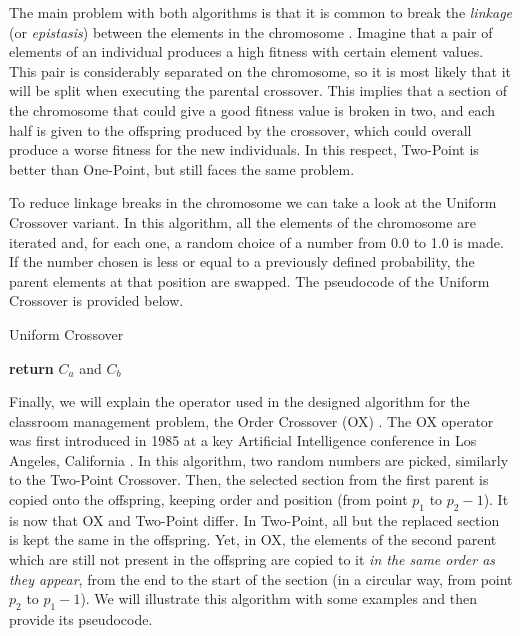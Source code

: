 The main problem with both algorithms is that it is common to break the \textit{linkage} (or \textit{epistasis}) between the elements in the chromosome \cite{luke13metaheuristics}. Imagine that a pair of elements of an individual produces a high fitness with certain element values. This pair is considerably separated on the chromosome, so it is most likely that it will be split when executing the parental crossover. This implies that a section of the chromosome that could give a good fitness value is broken in two, and each half is given to the offspring produced by the crossover, which could overall produce a worse fitness for the new individuals. In this respect, Two-Point is better than One-Point, but still faces the same problem. 

To reduce linkage breaks in the chromosome we can take a look at the Uniform Crossover variant. In this algorithm, all the elements of the chromosome are iterated and, for each one, a random choice of a number from 0.0 to 1.0 is made. If the number chosen is less or equal to a previously defined probability, the parent elements at that position are swapped. The pseudocode of the Uniform Crossover is provided below.

\begin{algorithm}[H]
    \caption{Uniform Crossover}
    \begin{algorithmic}[1]
                \EndIf
            \EndFor
            \State \textbf{return} {$C_{a}$ and $C_{b}$}
        \EndProcedure
    \end{algorithmic}
\end{algorithm}

Finally, we will explain the operator used in the designed algorithm for the classroom management problem, the Order Crossover (OX) \cite{davis85ox}. The OX operator was first introduced in 1985 at a key Artificial Intelligence conference in Los Angeles, California \cite{joshi85ai}. In this algorithm, two random numbers are picked, similarly to the Two-Point Crossover. Then, the selected section from the first parent is copied onto the offspring, keeping order and position (from point $p_{1}$ to $p_{2}-1$). It is now that OX and Two-Point differ. In Two-Point, all but the replaced section is kept the same in the offspring. Yet, in OX, the elements of the second parent which are still not present in the offspring are copied to it \textit{in the same order as they appear}, from the end to the start of the section (in a circular way, from point $p_{2}$ to $p_{1}-1$). We will illustrate this algorithm with some examples and then provide its pseudocode. 

